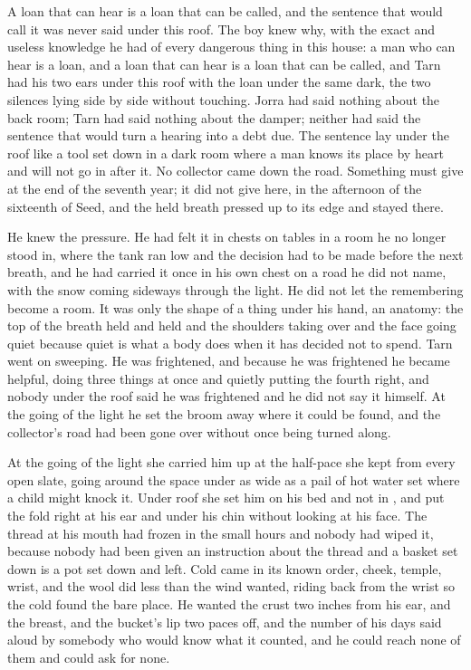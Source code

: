 A loan that can hear is a loan that can be called, and the sentence that would call it was never said under this roof. The boy knew why, with the exact and useless knowledge he had of every dangerous thing in this house: a man who can hear is a loan, and a loan that can hear is a loan that can be called, and Tarn had his two ears under this roof with the loan under the same dark, the two silences lying side by side without touching. Jorra had said nothing about the back room; Tarn had said nothing about the damper; neither had said the sentence that would turn a hearing into a debt due. The sentence lay under the roof like a tool set down in a dark room where a man knows its place by heart and will not go in after it. No collector came down the road. Something must give at the end of the seventh year; it did not give here, in the afternoon of the sixteenth of Seed, and the held breath pressed up to its edge and stayed there.

He knew the pressure. He had felt it in chests on tables in a room he no longer stood in, where the tank ran low and the decision had to be made before the next breath, and he had carried it once in his own chest on a road he did not name, with the snow coming sideways through the light. He did not let the remembering become a room. It was only the shape of a thing under his hand, an anatomy: the top of the breath held and held and the shoulders taking over and the face going quiet because quiet is what a body does when it has decided not to spend. Tarn went on sweeping. He was frightened, and because he was frightened he became helpful, doing three things at once and quietly putting the fourth right, and nobody under the roof said he was frightened and he did not say it himself. At the going of the light he set the broom away where it could be found, and the collector's road had been gone over without once being turned along.

\scenebreak

At the going of the light she carried him up  at the half-pace she kept from every open slate, going around the space under  as wide as a pail of hot water set where a child might knock it. Under  roof she set him on his bed and not in , and put the fold right at his ear and under his chin without looking at his face. The thread at his mouth had frozen in the small hours and nobody had wiped it, because nobody had been given an instruction about the thread and a basket set down is a pot set down and left. Cold came in its known order, cheek, temple, wrist, and the wool did less than the wind wanted, riding back from the wrist so the cold found the bare place. He wanted the crust two inches from his ear, and the breast, and the bucket's lip two paces off, and the number of his days said aloud by somebody who would know what it counted, and he could reach none of them and could ask for none.

